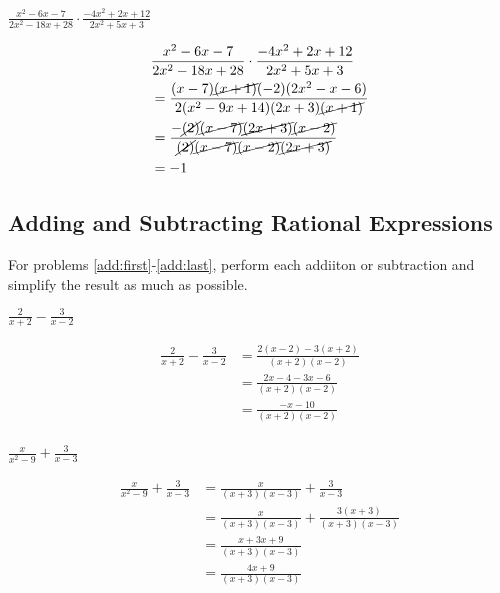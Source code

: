 \documentclass[fleqn,addpoints]{exam}
\begin{document}
\begin{questions}
\question[10] \( \displaystyle \frac{x^2-6x-7}{2x^2-18x+28} \cdot \frac{-4x^2 + 2x + 12}{2x^2+5x+3} \)
\label{multiply:last}
\begin{solution}[7 cm]
\begin{align*}
  & \frac{x^2-6x-7}{2x^2-18x+28} \cdot \frac{-4x^2 + 2x + 12}{2x^2+5x+3} \\
  &= \frac{(x-7) \cancel{(x+1)} (-2)(2x^2-x-6)}{2(x^2-9x+14)(2x+3) \cancel{(x+1)}} \\
  &= \frac{- \cancel{(2)} \cancel{(x-7)} \cancel{(2x+3)} \cancel{(x-2)} } {\cancel{(2)}\cancel{(x-7)} \cancel{(x-2)} \cancel{(2x+3)}} \\
  &= -1 \\
\end{align*}

\end{solution}

\subsection{Adding and Subtracting Rational Expressions}

For problems \ref{add:first}-\ref{add:last}, perform each addiiton or subtraction and simplify the result
as much as possible.

\question[5] \( \displaystyle \frac{2}{x+2} - \frac{3}{x-2} \)
\label{add:first}
\begin{solution}[5 cm]
\begin{align*}
  \frac{2}{x+2} - \frac{3}{x-2} &= \frac{2(x-2) - 3(x+2)}{(x+2)(x-2)} \\
  &= \frac{2x-4-3x-6}{(x+2)(x-2)} \\
  &= \frac{-x-10}{(x+2)(x-2)} \\
\end{align*}
\end{solution}

\question[5] \( \displaystyle \frac{x}{x^2-9} + \frac{3}{x-3} \)
\begin{solution}[5 cm]
\begin{align*}
  \frac{x}{x^2-9} + \frac{3}{x-3} &= \frac{x}{(x+3)(x-3)} + \frac{3}{x-3} \\
  &= \frac{x}{(x+3)(x-3)} + \frac{3(x+3)}{(x+3)(x-3)} \\
  &= \frac{x + 3x + 9}{(x+3)(x-3)} \\
  &= \frac{4x + 9}{(x+3)(x-3)} \\
\end{align*}

\end{solution}


\end{questions}
\end{document}
